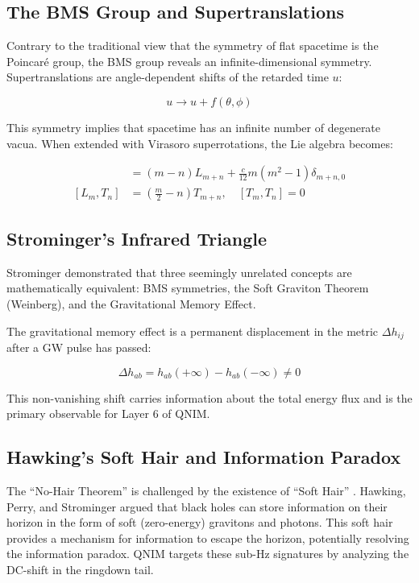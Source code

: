 \documentclass[11pt,a4paper,spanish]{book}
\numberwithin{equation}{chapter}
\numberwithin{figure}{chapter}
\numberwithin{equation}{chapter}
\numberwithin{figure}{chapter}
\numberwithin{table}{chapter}
\begin{document}
\subsection{The BMS Group and Supertranslations}

Contrary to the traditional view that the symmetry of flat spacetime is the Poincaré group, the BMS group reveals an infinite-dimensional symmetry. Supertranslations are angle-dependent shifts of the retarded time $u$:

\begin{equation}
u \to u + f(\theta, \phi)
\end{equation}

This symmetry implies that spacetime has an infinite number of degenerate vacua. When extended with Virasoro superrotations, the Lie algebra becomes:

\begin{align}
[L_m, L_n] &= (m-n)L_{m+n} + \frac{c}{12}m(m^2-1)\delta_{m+n,0} \\
[L_m, T_n] &= \left(\frac{m}{2}-n\right)T_{m+n}, \quad [T_m, T_n] = 0
\end{align}

\subsection{Strominger's Infrared Triangle}

Strominger \cite{Strominger_2016} demonstrated that three seemingly unrelated concepts are mathematically equivalent: BMS symmetries, the Soft Graviton Theorem (Weinberg), and the Gravitational Memory Effect. 



The gravitational memory effect is a permanent displacement in the metric $\Delta h_{ij}$ after a GW pulse has passed:

\begin{equation}
\Delta h_{ab} = h_{ab}(+\infty) - h_{ab}(-\infty) \neq 0
\end{equation}

This non-vanishing shift carries information about the total energy flux and is the primary observable for Layer 6 of QNIM.

\subsection{Hawking's Soft Hair and Information Paradox}

The ``No-Hair Theorem'' is challenged by the existence of ``Soft Hair'' \cite{Hawking_2016}. Hawking, Perry, and Strominger argued that black holes can store information on their horizon in the form of soft (zero-energy) gravitons and photons. This soft hair provides a mechanism for information to escape the horizon, potentially resolving the information paradox. QNIM targets these sub-Hz signatures by analyzing the DC-shift in the ringdown tail.
\end{document}
